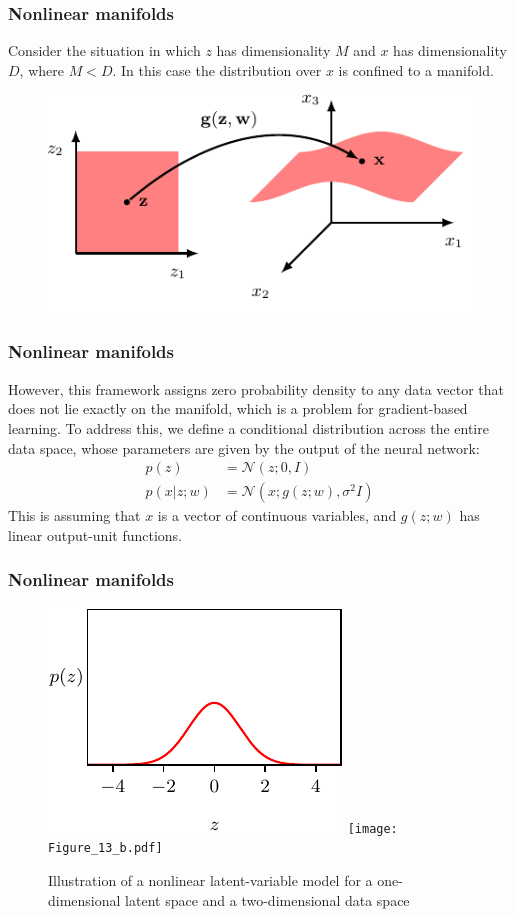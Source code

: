 \documentclass{beamer}
\begin{document}
\begin{frame}
    \frametitle{Nonlinear manifolds}
    Consider the situation in which $z$ has dimensionality $M$ and $x$ has dimensionality $D$, where $M<D$. In this case the distribution over $x$ is confined to a manifold.
    \begin{figure}
        \includegraphics{Figure_11.pdf}
    \end{figure}
\end{frame}

\begin{frame}
    \frametitle{Nonlinear manifolds}
    However, this framework assigns zero probability density to any data vector that does not lie exactly on the manifold, which is a problem for gradient-based learning. To address this, we define a conditional distribution across the entire data space, whose parameters are given by the output of the neural network:
    \begin{align*}
        p(z)&=\mathcal{N}(z;0,I) \\
        p(x|z;w)&=\mathcal{N}(x;g(z;w),\sigma^{2}I)
    \end{align*}
    This is assuming that $x$ is a vector of continuous variables, and $g(z;w)$ has linear output-unit functions.
\end{frame}

\begin{frame}
    \frametitle{Nonlinear manifolds}
    \begin{figure}
        \caption{Illustration of a nonlinear latent-variable model for a one-dimensional latent space and a two-dimensional data space}
        \includegraphics[height=0.4\textheight]{Figure_13_a.pdf}
        \texttt{[image: Figure\_13\_b.pdf]}
    \end{figure}
\end{frame}
\end{document}
